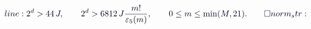 \documentclass[12pt]{article}
\begin{document}
\makeatletter
\renewcommand*{\@textcolor}[3]{%
  \protect\leavevmode
  \begingroup
    \color#1{#2}#3%
  \endgroup
}
\makeatother
\begin{displaymath}
\mathcolor[RGB]{0,0,15}{line:
2^d>44\,J,\qquad2^d>6812\,J\frac{m!}{\varepsilon_5(m)},\qquad0\leq} \mathcolor[RGB]{0,0,30}{m\leq\min(M,21).\qedhere

norm_str:}
\end{displaymath}
\end{document}
